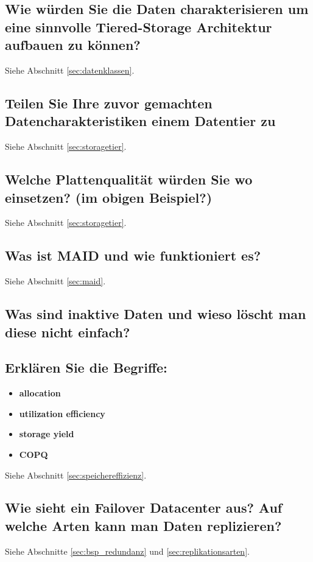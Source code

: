 \subsection{Wie würden Sie die Daten charakterisieren um eine sinnvolle Tiered-Storage Architektur aufbauen zu können?}
Siehe Abschnitt \ref{sec:datenklassen}.
\subsection{Teilen Sie Ihre zuvor gemachten Datencharakteristiken einem Datentier zu}
Siehe Abschnitt \ref{sec:storagetier}.
\subsection{Welche Plattenqualität würden Sie wo einsetzen? (im obigen Beispiel?)}
Siehe Abschnitt \ref{sec:storagetier}.
\subsection{Was ist MAID und wie funktioniert es?}
Siehe Abschnitt \ref{sec:maid}.
\subsection{Was sind inaktive Daten und wieso löscht man diese nicht einfach?}
\subsection{Erklären Sie die Begriffe:}
\begin{itemize}
	\item \textbf{allocation} \\
	\item \textbf{utilization efficiency} \\
	\item \textbf{storage yield} \\
	\item \textbf{COPQ} \\
\end{itemize}
Siehe Abschnitt \ref{sec:speichereffizienz}.
\subsection{Wie sieht ein Failover Datacenter aus? Auf welche Arten kann man Daten replizieren?}
Siehe Abschnitte \ref{sec:bsp_redundanz} und \ref{sec:replikationsarten}.